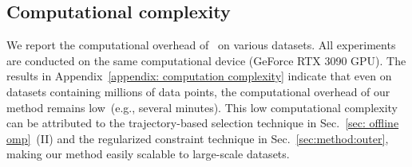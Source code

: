 

\subsection{Computational complexity}
We report the computational overhead of \name~on various datasets. 
All experiments are conducted on the same computational device (GeForce RTX 3090 GPU). 
The results in Appendix~\ref{appendix: computation complexity} indicate that even on datasets containing millions of data points, the computational overhead of our method remains low~(e.g., several minutes).
This low computational complexity can be attributed to the trajectory-based selection technique in Sec.~\ref{sec: offline omp}~(II) and the regularized constraint technique in Sec.~\ref{sec:method:outer}, making our method easily scalable to large-scale datasets. 



